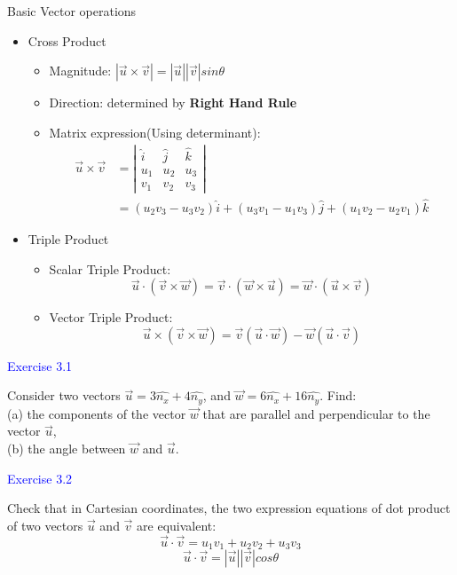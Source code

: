 \documentclass{beamer}
\begin{document}
\begin{frame}{Basic Vector operations}
  \begin{itemize}
    \item Cross Product
    \begin{itemize}
      \item Magnitude: $|\vec{u}\times \vec{v}|=|\vec{u}||\vec{v}|sin\theta$
      \item Direction: determined by \textbf{Right Hand Rule}
      \item Matrix expression(Using determinant):
      \begin{align*}
        \vec{u}\times \vec{v} &= \left|\begin{matrix}\hat{i}&\hat{j}&\hat{k}\\u_1 & u_2 & u_3\\ v_1 & v_2 & v_3 \end{matrix}\right|\\&=(u_2v_3-u_3v_2)\hat{i}+(u_3v_1-u_1v_3)\hat{j}+ (u_1v_2-u_2v_1)\hat{k}
 \end{align*}
    \end{itemize}
    \item Triple Product
    \begin{itemize}
      \item Scalar Triple Product:$$\vec{u}\cdot(\vec{v}\times \vec{w})=\vec{v}\cdot(\vec{w}\times \vec{u})=\vec{w}\cdot(\vec{u}\times \vec{v})$$
      \item Vector Triple Product:$$\vec{u}\times (\vec{v}\times \vec{w})=\vec{v}(\vec{u}\cdot\vec{w})-\vec{w}(\vec{u}\cdot \vec{v})$$
    \end{itemize}
  \end{itemize}
\end{frame}

\begin{frame}
\textcolor{blue}{Exercise 3.1}

Consider two vectors $ \vec{u}= 3\hat{n_x} +4\hat{n_y}$, and $\vec{w}= 6\hat{n_x} +16\hat{n_y}$. Find:\\
(a) the components of the vector $\vec w$ that are parallel and perpendicular
to the vector $\vec u$,\\
(b) the angle between $\vec w$ and $\vec u$.
\end{frame}

\begin{frame}
\textcolor{blue}{Exercise 3.2}

Check that in Cartesian coordinates, the two expression equations
of dot product of two vectors $\vec{u}$ and $\vec{v}$ are equivalent:$$\vec{u}\cdot \vec{v} = u_1v_1 + u_2v_2 + u_3v_3$$
$$\vec{u}\cdot \vec{v} = |\vec{u}||\vec{v}|cos\theta$$
\end{frame}
\end{document}
